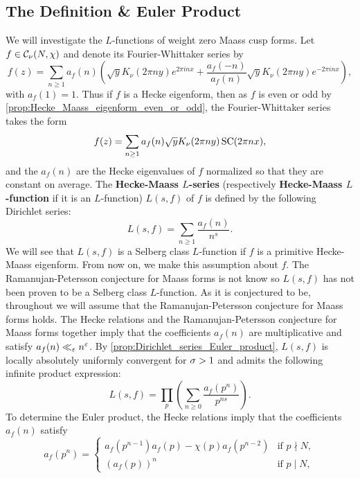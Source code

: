     \subsection*{The Definition \& Euler Product}
      We will investigate the $L$-functions of weight zero Maass cusp forms. Let $f \in \mathcal{C}_{\nu}(N,\chi)$ and denote its Fourier-Whittaker series by
      \[
        f(z) = \sum_{n \ge 1}a_{f}(n)\left(\sqrt{y}K_{\nu}(2\pi ny)e^{2\pi inx}+\frac{a_{f}(-n)}{a_{f}(n)}\sqrt{y}K_{\nu}(2\pi ny)e^{-2\pi inx}\right),
      \]
      with $a_{f}(1) = 1$. Thus if $f$ is a Hecke eigenform, then as $f$ is even or odd by \cref{prop:Hecke_Maass_eigenform_even_or_odd}, the Fourier-Whittaker series takes the form
      \[
        f(z) = \sum_{n \ge 1}a_{f}(n)\sqrt{y}K_{\nu}(2\pi ny)\operatorname{\mathrm{SC}}(2\pi nx),
      \]
      and the $a_{f}(n)$ are the Hecke eigenvalues of $f$ normalized so that they are constant on average. The \textbf{Hecke-Maass $L$-series} (respectively \textbf{Hecke-Maass $L$-function} if it is an $L$-function) $L(s,f)$ of $f$ is defined by the following Dirichlet series:
      \[
        L(s,f) = \sum_{n \ge 1}\frac{a_{f}(n)}{n^{s}}.
      \]
      We will see that $L(s,f)$ is a Selberg class $L$-function if $f$ is a primitive Hecke-Maass eigenform. From now on, we make this assumption about $f$. The Ramanujan-Petersson conjecture for Maass forms is not know so $L(s,f)$ has not been proven to be a Selberg class $L$-function. As it is conjectured to be, throughout we will assume that the Ramanujan-Petersson conjecture for Maass forms holds. The Hecke relations and the Ramanujan-Petersson conjecture for Maass forms together imply that the coefficients $a_{f}(n)$ are multiplicative and satisfy $a_{f}(n) \ll_{\varepsilon} n^{\varepsilon}$. By \cref{prop:Dirichlet_series_Euler_product}, $L(s,f)$ is locally absolutely uniformly convergent for $\sigma > 1$ and admits the following infinite product expression:
      \[
        L(s,f) = \prod_{p}\left(\sum_{n \ge 0}\frac{a_{f}(p^{n})}{p^{ns}}\right).
      \]
      To determine the Euler product, the Hecke relations imply that the coefficients $a_{f}(n)$ satisfy
      \begin{equation}\label{equ:primitive_Hecke_eigenform_recurrence_for_coefficients_of_Maass_L-function}
        a_{f}(p^{n}) = \begin{cases} a_{f}(p^{n-1})a_{f}(p)-\chi(p)a_{f}(p^{n-2}) & \text{if $p \nmid N$}, \\ (a_{f}(p))^{n} & \text{if $p \mid N$}, \end{cases}
      \end{equation}
